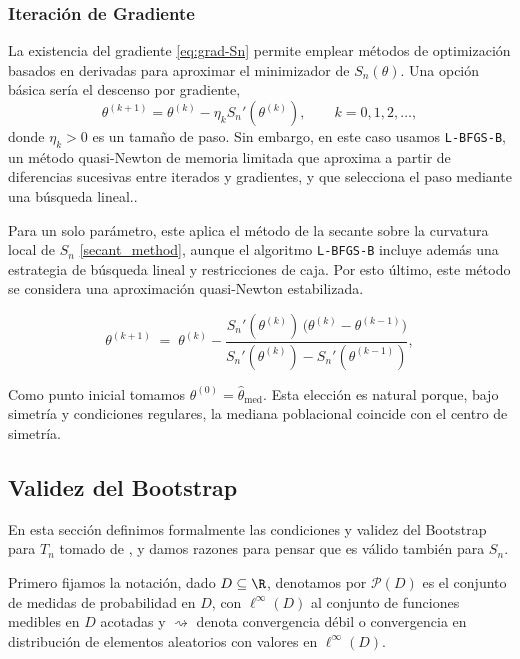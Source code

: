 \subsubsection{Iteración de Gradiente}

La existencia del gradiente \eqref{eq:grad-Sn} permite emplear métodos de optimización basados en derivadas para aproximar el minimizador de \(S_n(\theta)\). Una opción básica sería el descenso por gradiente,
\[
\theta^{(k+1)}
=
\theta^{(k)}-\eta_k S_n'(\theta^{(k)}),
\qquad k=0,1,2,\dots,
\]
donde \(\eta_k>0\) es un tamaño de paso. Sin embargo, en este caso usamos \texttt{L-BFGS-B}, un método quasi-Newton de memoria limitada que aproxima a partir de diferencias sucesivas entre iterados y gradientes, y que selecciona el paso mediante una búsqueda lineal..

Para un solo parámetro, este aplica el método de la secante sobre la curvatura local de \(S_n\) \eqref{secant_method}, aunque el algoritmo \texttt{L-BFGS-B} incluye además una estrategia de búsqueda lineal y restricciones de caja. Por esto último, este método se considera una aproximación quasi-Newton estabilizada.

\begin{equation} \label{secant_method}
\theta^{(k+1)} \;=\; \theta^{(k)} - \frac{S_n'(\theta^{(k)})\,\bigl(\theta^{(k)}-\theta^{(k-1)}\bigr)}{S_n'(\theta^{(k)})-S_n'(\theta^{(k-1)})},
\end{equation}


Como punto inicial tomamos \(\theta^{(0)}=\hat\theta_{\mathrm{med}}\). Esta elección es natural porque, bajo simetría y condiciones regulares, la mediana poblacional coincide con el centro de simetría.

\newpage
\subsection{Validez del Bootstrap}

En esta sección definimos formalmente las condiciones y validez del Bootstrap para $T_n$ tomado de \cite{arcones1991bootstrap}, y damos razones para pensar que es válido también para $S_n$. 

Primero fijamos la notación, dado $D\s\R$, denotamos por $\mathcal{P}(D)$ es el conjunto de medidas de probabilidad en $D$, con $\ell^\infty(D)$ al conjunto de funciones medibles en $D$ acotadas y   $\rightsquigarrow$ denota convergencia débil o convergencia en distribución de elementos aleatorios con valores en  $\ell^\infty(D)$.

